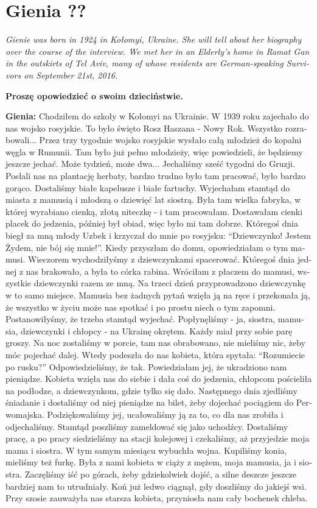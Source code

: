 \section{Gienia ??}
\begin{otherlanguage}{ngerman}
\textit{Gienie was born in 1924 in Kołomyi, Ukraine. She will tell about her biography over the course of the interview. We met her in an Elderly’s home in Ramat Gan in the outskirts of Tel Aviv, many of whose residents are German-speaking Survivors on September 21st, 2016.}\par
\vspace*{2em}
\textbf{Proszę opowiedzieć o swoim dzieciństwie.}

\textbf{Gienia:} Chodziłem do szkoły w Kołomyi na Ukrainie. W 1939 roku zajechało do nas wojsko rosyjskie. To było święto Rosz Haszana - Nowy Rok. Wszystko rozrabowali... Przez trzy tygodnie wojsko rosyjskie wysłało całą młodzież do kopalni węgla w Rumunii. Tam było już pełno młodzieży, więc powiedzieli, że będziemy jeszcze jechać. Może tydzień, może dwa... Jechaliśmy sześć tygodni do Gruzji. Posłali nas na plantację herbaty, bardzo trudno było tam pracować, było bardzo gorąco. Dostaliśmy białe kapelusze i białe fartuchy. Wyjechałam stamtąd do miasta z mamusią i młodszą o dziewięć lat siostrą. Była tam wielka fabryka, w której wyrabiano cienką, złotą niteczkę - i tam pracowałam. Dostawałam cienki placek do jedzenia, później był obiad, więc było mi tam dobrze. Któregoś dnia biegł za mną młody Uzbek i krzyczał do mnie po rosyjsku: "`Dziewczynko! Jestem Żydem, nie bój się mnie!"'. Kiedy przyszłam do domu, opowiedziałam o tym mamusi. Wieczorem wychodziłyśmy z dziewczynkami spacerować. Któregoś dnia jednej z nas brakowało, a była to córka rabina. Wróciłam z płaczem do mamusi, wszystkie dziewczynki razem ze mną. Na trzeci dzień przyprowadzono dziewczynkę w to samo miejsce. Mamusia bez żadnych pytań wzięła ją na ręce i przekonała ją, że wszystko w życiu może nas spotkać i po prostu niech o tym zapomni. Postanowiłyśmy, że trzeba stamtąd wyjechać. Popłynęliśmy - ja, siostra, mamusia, dziewczynki i chłopcy - na Ukrainę okrętem. Każdy miał przy sobie parę groszy. Na noc zostaliśmy w porcie, tam nas obrabowano, nie mieliśmy nic, żeby móc pojechać dalej. Wtedy podeszła do nas kobieta, która spytała: "`Rozumiecie po rusku?"' Odpowiedzieliśmy, że tak. Powiedziałam jej, że ukradziono nam pieniądze. Kobieta wzięła nas do siebie i dała coś do jedzenia, chłopcom pościeliła na podłodze, a dziewczynkom, gdzie tylko się dało. Następnego dnia zjedliśmy śniadanie i dostaliśmy od niej pieniądze na bilet, żeby dojechać pociągiem do Perwomajska. Podziękowaliśmy jej, ucałowaliśmy ją za to, co dla nas zrobiła i odjechaliśmy. Stamtąd poszliśmy zameldować się jako uchodźcy. Dostaliśmy pracę, a po pracy siedzieliśmy na stacji kolejowej i czekaliśmy, aż przyjedzie moja mama i siostra. W tym samym miesiącu wybuchła wojna. Kupiliśmy konia, mieliśmy też furkę. Była z nami kobieta w ciąży z mężem, moja mamusia, ja i siostra. Zaczęliśmy iść po górach, żeby gdziekolwiek dojść, a silne deszcze jeszcze bardziej nam to utrudniały. Koń już ledwo ciągnął, gdy doszliśmy do jakiejś wsi. Przy szosie zauważyła nas starsza kobieta, przyniosła nam cały bochenek chleba. 
\end{otherlanguage}
